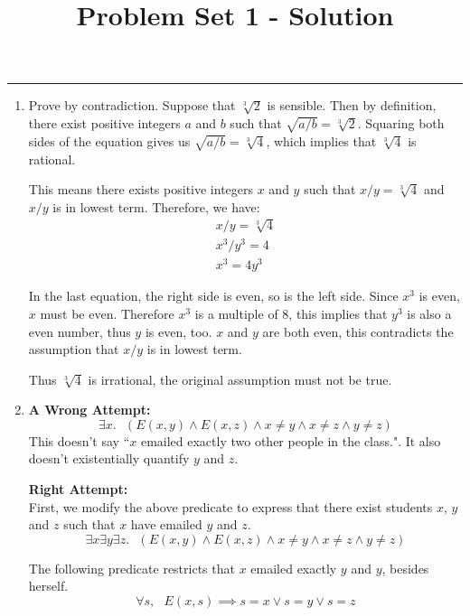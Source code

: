 \documentclass[11pt]{article}
\title{Problem Set 1 - Solution}
\begin{document}
\maketitle
\hrule\smallskip

\begin{enumerate}
\item %
  Prove by contradiction. Suppose that $\sqrt[3]{2}$ is sensible. Then
  by definition, there exist positive integers $a$ and $b$ such that
  $\sqrt{a/b} = \sqrt[3]{2}$. Squaring both sides of the equation gives us
  $\sqrt{a/b}=\sqrt[3]{4}$, which implies that $\sqrt[3]{4}$ is
  rational. 

  This means there exists positive integers $x$ and $y$ such that
  $x/y=\sqrt[3]{4}$ and $x/y$ is in lowest term. Therefore, we have:
  \begin{align}
    x/y = \sqrt[3]{4} \\
    x^3/y^3 = 4 \\
    x^3 = 4y^3
  \end{align}

In the last equation, the right side is even, so is the left
side. Since $x^3$ is even, $x$ must be even. Therefore $x^3$ is a
multiple of 8, this implies that $y^3$ is also a even number, thus $y$
is even, too. $x$ and $y$ are both even, this contradicts the
assumption that $x/y$ is in lowest term. 

Thus $\sqrt[3]{4}$ is irrational, the original assumption must not be
true. 

\item %
  \textbf{A Wrong Attempt:}
  \begin{equation}
    \exists{x}. \text{  } (E(x,y) \land E(x,z) \land x \neq y \land x
    \neq z \land y \neq z)
  \end{equation}
  This doesn't say ``$x$ emailed exactly two other people in the
  class.". It also doesn't existentially quantify $y$ and $z$.

  \textbf{Right Attempt:} \\
  First, we modify the above predicate to express that there exist
  students $x$, $y$ and $z$ such that $x$ have emailed $y$ and $z$. 
  \begin{equation}
    \exists{x}\exists{y}\exists{z}. \text{  } (E(x,y) \land E(x,z)
    \land x \neq y \land x \neq z \land y \neq z)
  \end{equation}

  The following predicate restricts that $x$ emailed exactly $y$ and
  $y$, besides herself.
  \begin{equation}
    \forall{s}, \text{ } E(x,s) \implies s = x \lor s = y \lor s = z
  \end{equation}


\end{enumerate}
\end{document}
